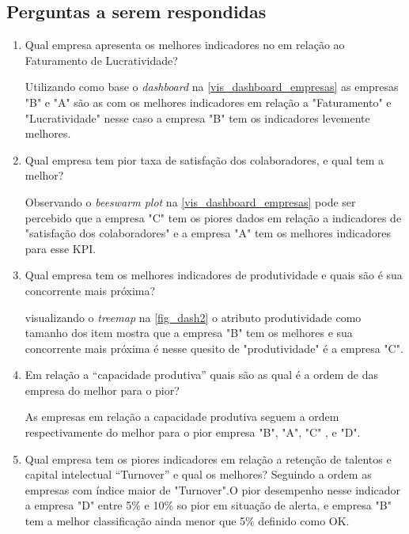 \documentclass[
	12pt,				%
	openright,			%
	oneside,			%
	a4paper,			%
	english,			%
	brazil				%
	]{abntex2}
\begin{document}
\begin{itemize}
\end{itemize}

\subsection{Perguntas a serem respondidas}
\begin{enumerate}
    \item Qual empresa apresenta os melhores indicadores no em relação ao Faturamento de Lucratividade?
    
     Utilizando como base o \textit{dashboard} na \autoref{vis_dashboard_empresas} as empresas "B" e "A" são as com os melhores indicadores em relação a "Faturamento" e "Lucratividade" nesse caso a empresa "B" tem os indicadores levemente melhores.
    \item Qual empresa tem pior taxa de satisfação dos colaboradores, e qual tem a melhor?
    
    Observando o \textit{beeswarm plot} na \autoref{vis_dashboard_empresas} pode ser percebido que a empresa "C" tem os piores dados em relação a indicadores de "satisfação dos colaboradores" e a empresa "A" tem os melhores indicadores para esse KPI.
    
    \item Qual empresa tem os melhores indicadores de produtividade e quais são é sua concorrente mais próxima?
    
    visualizando o \textit{treemap} na \autoref{fig_dash2} o atributo produtividade como tamanho dos item mostra que a empresa "B" tem os melhores e sua concorrente mais próxima é nesse quesito de "produtividade" é a empresa "C".
    
    \item Em relação a “capacidade produtiva” quais são as qual é a ordem de das empresa do melhor para o pior?
    
    As empresas em relação a capacidade produtiva seguem a ordem respectivamente do melhor para o pior empresa "B", "A", "C" , e "D". 
    
    \item Qual empresa tem os piores indicadores em relação a retenção de talentos e capital intelectual “Turnover” e qual os melhores?
    Seguindo a ordem as empresas com índice maior de "Turnover".O pior desempenho nesse indicador a empresa "D" entre 5\% e 10\% so pior em situação de alerta, e empresa "B" tem a melhor classificação ainda menor que 5\% definido como OK.
    
    
    
\end{enumerate}
\end{document}
